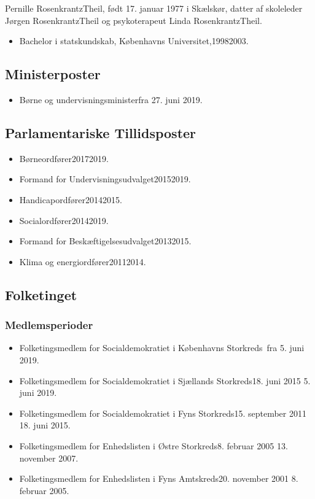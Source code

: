 \documentclass[11pt, a4paper]{awesome-cv}
\begin{document}
\makecvheader[R]
\makelettertitle
\begin{cvletter}
Pernille RosenkrantzTheil, født 17. januar 1977 i Skælskør, datter af skoleleder Jørgen RosenkrantzTheil og psykoterapeut Linda RosenkrantzTheil.

\begin{itemize}
\item Bachelor i statskundskab, Københavns Universitet,19982003.
\end{itemize}
\subsection*{Ministerposter}
\begin{itemize}
\item Børne og undervisningsministerfra 27. juni 2019.
\end{itemize}
\subsection*{Parlamentariske Tillidsposter}
\begin{itemize}
\item Børneordfører20172019.
\item Formand for Undervisningsudvalget20152019.
\item Handicapordfører20142015.
\item Socialordfører20142019.
\item Formand for Beskæftigelsesudvalget20132015.
\item Klima og energiordfører20112014.
\end{itemize}
\subsection*{Folketinget}
\subsubsection*{Medlemsperioder}
\begin{itemize}
\item Folketingsmedlem for Socialdemokratiet i Københavns Storkreds fra 5. juni 2019.
\item Folketingsmedlem for Socialdemokratiet i Sjællands Storkreds18. juni 2015  5. juni 2019.
\item Folketingsmedlem for Socialdemokratiet i Fyns Storkreds15. september 2011  18. juni 2015.
\item Folketingsmedlem for Enhedslisten i Østre Storkreds8. februar 2005  13. november 2007.
\item Folketingsmedlem for Enhedslisten i Fyns Amtskreds20. november 2001  8. februar 2005.
\end{itemize}

\end{cvletter}
\end{document}
